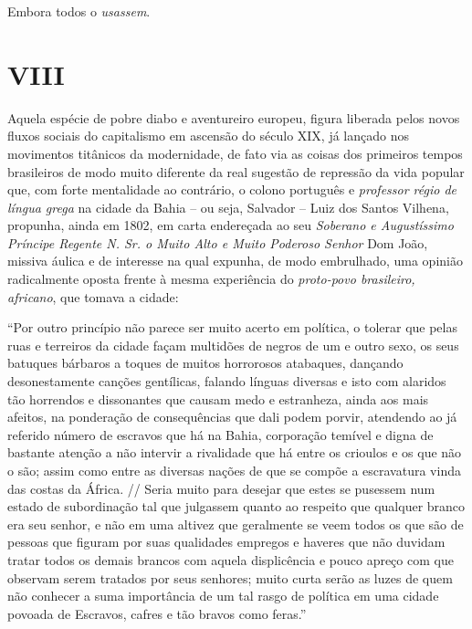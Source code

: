 Embora todos o \emph{usassem}.

\section{VIII}

Aquela espécie de pobre diabo e aventureiro europeu, figura liberada
pelos novos fluxos sociais do capitalismo em ascensão do século XIX, já
lançado nos movimentos titânicos da modernidade, de fato via as coisas
dos primeiros tempos brasileiros de modo muito diferente da real
sugestão de repressão da vida popular que, com forte mentalidade ao
contrário, o colono português e \emph{professor régio de língua grega}
na cidade da Bahia -- ou seja, Salvador -- Luiz dos Santos Vilhena,
propunha, ainda em 1802, em carta endereçada ao seu \emph{Soberano e
Augustíssimo Príncipe Regente N. Sr. o Muito Alto e Muito Poderoso
Senhor} Dom João, missiva áulica e de interesse na qual expunha, de modo
embrulhado, uma opinião radicalmente oposta frente à mesma experiência
do \emph{proto-povo brasileiro, africano}, que tomava a cidade:

``Por outro princípio não parece ser muito acerto em política, o tolerar
que pelas ruas e terreiros da cidade façam multidões de negros de um e
outro sexo, os seus batuques bárbaros a toques de muitos horrorosos
atabaques, dançando desonestamente canções gentílicas, falando línguas
diversas e isto com alaridos tão horrendos e dissonantes que causam medo
e estranheza, ainda aos mais afeitos, na ponderação de consequências que
dali podem porvir, atendendo ao já referido número de escravos que há na
Bahia, corporação temível e digna de bastante atenção a não intervir a
rivalidade que há entre os crioulos e os que não o são; assim como entre
as diversas nações de que se compõe a escravatura vinda das costas da
África. // Seria muito para desejar que estes se pusessem num estado de
subordinação tal que julgassem quanto ao respeito que qualquer branco
era seu senhor, e não em uma altivez que geralmente se veem todos os que
são de pessoas que figuram por suas qualidades empregos e haveres que
não duvidam tratar todos os demais brancos com aquela displicência e
pouco apreço com que observam serem tratados por seus senhores; muito
curta serão as luzes de quem não conhecer a suma importância de um tal
rasgo de política em uma cidade povoada de Escravos, cafres e tão bravos
como feras.''

